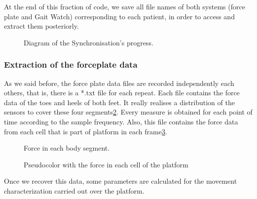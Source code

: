 At the end of this fraction of code, we save all file names of both systems (force plate and Gait Watch) corresponding to each patient, in order to access and extract them posteriorly.

\begin{figure}[H]
	\centering
	\caption{Diagram of the Synchronisation's progress.}
	\label{fig:diagramSynchronisation}
\end{figure}


\subsubsection{Extraction of the forceplate data}
As we said before, the  force plate data files are recorded independently each others, that is, there is a *.txt file for each repeat.
Each file contains the force data of the toes and heels of both feet. It really realises a distribution of the sensors to cover these four segments\ref{fig:Force4signals}. Every measure is obtained for each point of time according to the sample frequency. Also, this file contains the force data from each cell that is part of platform in each frame\ref{fig:pseudocolor}.

\begin{figure}[H]
	\centering
	\caption{Force in each body segment.}
	\label{fig:Force4signals}
\end{figure}

\begin{figure}[H]
	\centering
	\caption{Pseudocolor with the force in each cell of the platform}
	\label{fig:pseudocolor}
\end{figure}

Once we recover this data, some parameters are calculated for the movement characterization carried out over the platform. 

